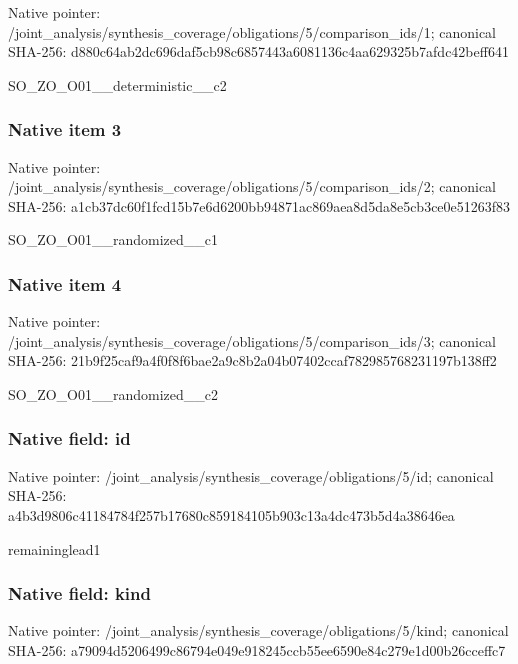 \documentclass[10pt,a4paper]{article}
\begin{document}
Native pointer: /joint\_analysis/synthesi\allowbreak{}s\_coverage/obligations/5\allowbreak{}/comparison\_ids/1; canonical SHA-256: d880c64ab2dc696daf5cb98c\allowbreak{}6857443a6081136c4aa62932\allowbreak{}5b7afdc42beff641


SO\_ZO\_O01\_\_deterministic\_\_c2


\subsubsection{Native item 3}


Native pointer: /joint\_analysis/synthesi\allowbreak{}s\_coverage/obligations/5\allowbreak{}/comparison\_ids/2; canonical SHA-256: a1cb37dc60f1fcd15b7e6d62\allowbreak{}00bb94871ac869aea8d5da8e\allowbreak{}5cb3ce0e51263f83


SO\_ZO\_O01\_\_randomized\_\_c1


\subsubsection{Native item 4}


Native pointer: /joint\_analysis/synthesi\allowbreak{}s\_coverage/obligations/5\allowbreak{}/comparison\_ids/3; canonical SHA-256: 21b9f25caf9a4f0f8f6bae2a\allowbreak{}9c8b2a04b07402ccaf782985\allowbreak{}768231197b138ff2


SO\_ZO\_O01\_\_randomized\_\_c2


\subsubsection{Native field: id}


Native pointer: /joint\_analysis/synthesi\allowbreak{}s\_coverage/obligations/5\allowbreak{}/id; canonical SHA-256: a4b3d9806c41184784f257b1\allowbreak{}7680c859184105b903c13a4d\allowbreak{}c473b5d4a38646ea


remaininglead1


\subsubsection{Native field: kind}


Native pointer: /joint\_analysis/synthesi\allowbreak{}s\_coverage/obligations/5\allowbreak{}/kind; canonical SHA-256: a79094d5206499c86794e049\allowbreak{}e918245ccb55ee6590e84c27\allowbreak{}9e1d00b26cceffc7
\end{document}

